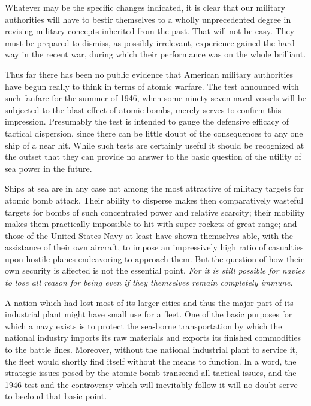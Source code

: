 Whatever may be the specific changes indicated, it is clear that our military authorities will have to bestir themselves to a wholly unprecedented degree in revising military concepts inherited from the past. That will not be easy. They must be prepared to dismiss, as possibly irrelevant, experience gained the hard way in the recent war, during which their performance was on the whole brilliant.

Thus far there has been no public evidence that American military authorities have begun really to think in terms of atomic warfare. The test announced with such fanfare for the summer of 1946, when some ninety-seven naval vessels will be subjected to the blast effect of atomic bombs, merely serves to confirm this impression. Presumably the test is intended to gauge the defensive efficacy of tactical dispersion, since there can be little doubt of the consequences to any one ship of a near hit. While such tests are certainly useful it should be recognized at the outset that they can provide no answer to the basic question of the utility of sea power in the future.

Ships at sea are in any case not among the most attractive of military targets for atomic bomb attack. Their ability to disperse makes then comparatively wasteful targets for bombs of such concentrated power and relative scarcity; their mobility makes them practically impossible to hit with super-rockets of great range; and those of the United States Navy at least have shown themselves able, with the assistance of their own aircraft, to impose an impressively high ratio of casualties upon hostile planes endeavoring to approach them. But the question of how their own security is affected is not the essential point. \emph{For it is still possible for navies to lose all reason for being even if they themselves remain completely immune}.

A nation which had lost most of its larger cities and thus the major part of its industrial plant might have small use for a fleet. One of the basic purposes for which a navy exists is to protect the sea-borne transportation by which the national industry imports its raw materials and exports its finished commodities to the battle lines. Moreover, without the national industrial plant to service it, the fleet would shortly find itself without the means to function. In a word, the strategic issues posed by the atomic bomb transcend all tactical issues, and the 1946 test and the controversy which will inevitably follow it will no doubt serve to becloud that basic point.

